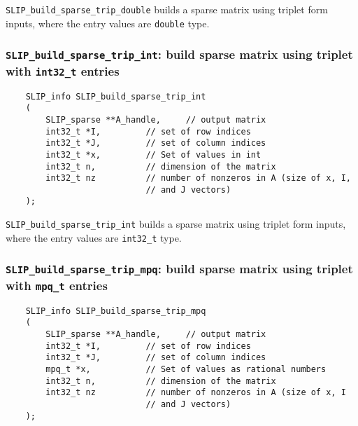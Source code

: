 \documentclass[12pt]{article}
\theoremstyle{definition}
\begin{document}
\verb|SLIP_build_sparse_trip_double| builds a sparse matrix using triplet form
inputs, where the entry values are \verb|double| type.

\cprotect\subsubsection{\verb|SLIP_build_sparse_trip_int|: build sparse matrix using triplet with \verb|int32_t| entries}
\label{s:user:build_sparse_trip_int}

\begin{mdframed}[userdefinedwidth=6in]
{\footnotesize
\begin{verbatim}
    SLIP_info SLIP_build_sparse_trip_int
    (
        SLIP_sparse **A_handle,     // output matrix
        int32_t *I,         // set of row indices
        int32_t *J,         // set of column indices
        int32_t *x,         // Set of values in int
        int32_t n,          // dimension of the matrix
        int32_t nz          // number of nonzeros in A (size of x, I,
                            // and J vectors)
    );
\end{verbatim}
} \end{mdframed}

\verb|SLIP_build_sparse_trip_int| builds a sparse matrix using triplet form
inputs, where the entry values are \verb|int32_t| type.

\cprotect\subsubsection{\verb|SLIP_build_sparse_trip_mpq|: build sparse matrix using triplet with \verb|mpq_t| entries}
\label{s:user:build_sparse_trip_mpq}

\begin{mdframed}[userdefinedwidth=6in]
{\footnotesize
\begin{verbatim}
    SLIP_info SLIP_build_sparse_trip_mpq
    (
        SLIP_sparse **A_handle,     // output matrix
        int32_t *I,         // set of row indices
        int32_t *J,         // set of column indices
        mpq_t *x,           // Set of values as rational numbers
        int32_t n,          // dimension of the matrix
        int32_t nz          // number of nonzeros in A (size of x, I
                            // and J vectors)
    );
\end{verbatim}
} \end{mdframed}
\end{document}
